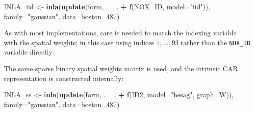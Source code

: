 \documentclass[]{book}
\newenvironment{Shaded}{\begin{snugshade}}{\end{snugshade}}
\newcommand{\DataTypeTok}[1]{\textcolor[rgb]{0.13,0.29,0.53}{#1}}
\newcommand{\DecValTok}[1]{\textcolor[rgb]{0.00,0.00,0.81}{#1}}
\newcommand{\KeywordTok}[1]{\textcolor[rgb]{0.13,0.29,0.53}{\textbf{#1}}}
\newcommand{\NormalTok}[1]{#1}
\newcommand{\OperatorTok}[1]{\textcolor[rgb]{0.81,0.36,0.00}{\textbf{#1}}}
\newcommand{\StringTok}[1]{\textcolor[rgb]{0.31,0.60,0.02}{#1}}
\begin{document}
\begin{Shaded}
\begin{Highlighting}[]
\NormalTok{INLA_iid <-}\StringTok{ }\KeywordTok{inla}\NormalTok{(}\KeywordTok{update}\NormalTok{(form, . }\OperatorTok{~}\StringTok{ }\NormalTok{. }\OperatorTok{+}\StringTok{ }\KeywordTok{f}\NormalTok{(NOX_ID, }\DataTypeTok{model=}\StringTok{"iid"}\NormalTok{)), }\DataTypeTok{family=}\StringTok{"gaussian"}\NormalTok{, }
    \DataTypeTok{data=}\NormalTok{boston_}\DecValTok{487}\NormalTok{)}
\end{Highlighting}
\end{Shaded}

\begin{Shaded}
\end{Shaded}

As with most implementations, care is needed to match the indexing variable with the spatial weights; in this case using indices \(1, \dots, 93\) rather than the \texttt{NOX\_ID} variable directly:

\begin{Shaded}
\end{Shaded}

The same sparse binary spatial weights matrix is used, and the intrinsic CAR representation is constructed internally:

\begin{Shaded}
\begin{Highlighting}[]
\NormalTok{INLA_ss <-}\StringTok{ }\KeywordTok{inla}\NormalTok{(}\KeywordTok{update}\NormalTok{(form, . }\OperatorTok{~}\StringTok{ }\NormalTok{. }\OperatorTok{+}\StringTok{ }\KeywordTok{f}\NormalTok{(ID2, }\DataTypeTok{model=}\StringTok{"besag"}\NormalTok{, }\DataTypeTok{graph=}\NormalTok{W)), }\DataTypeTok{family=}\StringTok{"gaussian"}\NormalTok{,}
    \DataTypeTok{data=}\NormalTok{boston_}\DecValTok{487}\NormalTok{)}
\end{Highlighting}
\end{Shaded}
\end{document}
